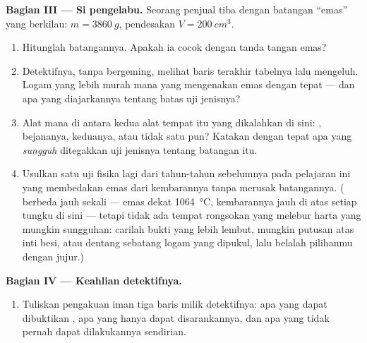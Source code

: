 \begin{problem}
\medskip\noindent\textbf{Bagian III --- Si pengelabu.}
Seorang penjual tiba dengan batangan ``emas'' yang berkilau:
$m = \qty{3860}{g}$, pendesakan $V = \qty{200}{cm^3}$.
\begin{enumerate}[resume]
  \item Hitunglah  batangannya. Apakah ia cocok dengan
        tanda tangan emas?
  \item Detektifnya, tanpa bergeming, melihat baris terakhir tabelnya
        lalu mengeluh. Logam yang lebih murah mana yang mengenakan
         emas dengan tepat --- dan apa yang diajarkannya
        tentang batas uji  jenisnya?
  \item Alat mana di antara kedua alat tempat itu yang dikalahkan di
        sini: , bejananya, keduanya, atau tidak satu pun?
        Katakan dengan tepat apa yang \emph{sungguh} ditegakkan uji
         jenisnya tentang batangan itu.
  \item Usulkan satu uji fisika lagi dari tahun-tahun sebelumnya pada
        pelajaran ini yang membedakan emas dari kembarannya tanpa
        merusak batangannya. ( berbeda jauh sekali ---
        emas dekat \qty{1064}{\celsius}, kembarannya jauh di atas
        setiap tungku di sini --- tetapi tidak ada tempat rongsokan
        yang melebur harta yang mungkin sungguhan: carilah bukti yang
        lebih lembut, mungkin putusan  atas inti besi, atau
        dentang sebatang logam yang dipukul, lalu belalah pilihanmu
        dengan jujur.)
\end{enumerate}

\medskip\noindent\textbf{Bagian IV --- Keahlian detektifnya.}
\begin{enumerate}[resume]
  \item Tuliskan pengakuan iman tiga baris milik detektifnya: apa yang
        dapat dibuktikan , apa yang hanya dapat
        disarankannya, dan apa yang tidak pernah dapat dilakukannya
        sendirian.
\end{enumerate}
\end{problem}
